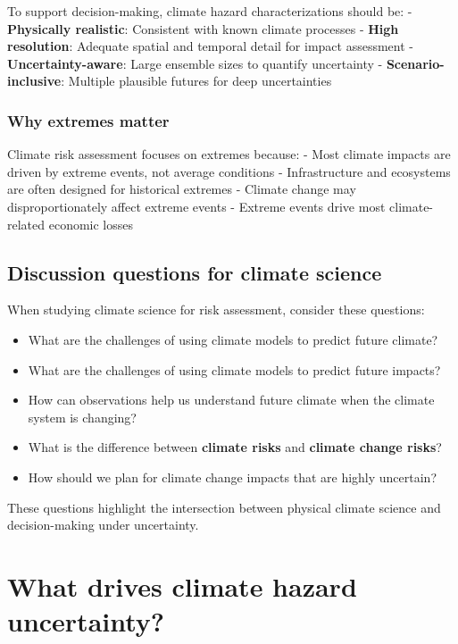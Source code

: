 \documentclass[
  letterpaper,
  DIV=11,
  numbers=noendperiod]{scrreprt}
\providecommand{\tightlist}{%
  \setlength{\itemsep}{0pt}\setlength{\parskip}{0pt}}
\begin{document}
To support decision-making, climate hazard characterizations should be:
- \textbf{Physically realistic}: Consistent with known climate processes
- \textbf{High resolution}: Adequate spatial and temporal detail for
impact assessment - \textbf{Uncertainty-aware}: Large ensemble sizes to
quantify uncertainty - \textbf{Scenario-inclusive}: Multiple plausible
futures for deep uncertainties

\subsubsection{Why extremes matter}\label{why-extremes-matter}

Climate risk assessment focuses on extremes because: - Most climate
impacts are driven by extreme events, not average conditions -
Infrastructure and ecosystems are often designed for historical extremes
- Climate change may disproportionately affect extreme events - Extreme
events drive most climate-related economic losses

\subsection{Discussion questions for climate
science}\label{discussion-questions-for-climate-science}

When studying climate science for risk assessment, consider these
questions:

\begin{itemize}
\tightlist
\item
  What are the challenges of using climate models to predict future
  climate?
\item
  What are the challenges of using climate models to predict future
  impacts?
\item
  How can observations help us understand future climate when the
  climate system is changing?
\item
  What is the difference between \textbf{climate risks} and
  \textbf{climate change risks}?
\item
  How should we plan for climate change impacts that are highly
  uncertain?
\end{itemize}

These questions highlight the intersection between physical climate
science and decision-making under uncertainty.

\section{What drives climate hazard
uncertainty?}\label{what-drives-climate-hazard-uncertainty}
\end{document}
